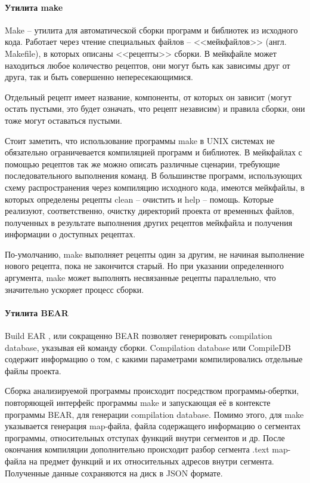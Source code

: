 \paragraph{Утилита make}\label{sec:ch2/sec2/sub3/sub1/par1}\mbox{}

Make -- утилита для автоматической сборки программ и библиотек из исходного кода.
Работает через чтение специальных файлов -- <<мейкфайлов>> (англ. Makefile), в которых 
описаны <<рецепты>> сборки. В мейкфайле может находиться любое количество рецептов, они могут
быть как зависимы друг от друга, так и быть совершенно непересекающимися.

Отдельный рецепт имеет название, компоненты, от которых он зависит (могут остать пустыми, это будет означать,
что рецепт независим) и правила сборки, они тоже могут оставаться пустыми.

Стоит заметить, что использование программы make в UNIX системах не обязательно ограничевается
компиляцией программ и библиотек. В мейкфайлах с помощью рецептов так же можно описать различные сценарии,
требующие последовательного выполнения команд. В большинстве программ, использующих схему распространения
через компиляцию исходного кода, имеются мейкфайлы, в которых определены рецепты clean -- очистить и help --
помощь. Которые реализуют, соответственно, очистку директорий проекта от временных файлов, полученных в результате
выполнения других рецептов мейкфайла и получения информации о доступных рецептах.

По-умолчанию, make выполняет рецепты один за другим, не начиная выполнение нового рецепта, пока
не закончится старый. Но при указании определенного аргумента, make может выполнять несвязанные рецепты
параллельно, что значительно ускоряет процесс сборки.

\paragraph{Утилита BEAR}\label{sec:ch2/sec2/sub3/sub1/par2}\mbox{}

Build EAR \autocite{bear}, или сокращенно BEAR позволяет генерировать compilation database, указывая ей
команду сборки. Compilation database или CompileDB содержит информацию о том, с какими параметрами
компилировались отдельные файлы проекта.

Сборка анализируемой программы происходит посредством программы-обертки, повторяющей интерфейс программы make
и запускающая её в контексте программы BEAR, для генерации compilation database. Помимо этого, для make
указывается генерация map-файла, файла содержащего информацию о сегментах программы,
относительных отступах функций внутри сегментов и др. После окончания компиляции дополнительно
происходит разбор сегмента .text map-файла на предмет функций и их относительных адресов внутри сегмента.
Полученные данные сохраняются на диск в JSON формате.

